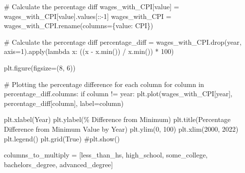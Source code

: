 \documentclass[
  letterpaper,
  DIV=11,
  numbers=noendperiod]{scrartcl}
\newenvironment{Shaded}{\begin{snugshade}}{\end{snugshade}}
\newcommand{\BuiltInTok}[1]{\textcolor[rgb]{0.00,0.23,0.31}{#1}}
\newcommand{\CommentTok}[1]{\textcolor[rgb]{0.37,0.37,0.37}{#1}}
\newcommand{\ControlFlowTok}[1]{\textcolor[rgb]{0.00,0.23,0.31}{#1}}
\newcommand{\DecValTok}[1]{\textcolor[rgb]{0.68,0.00,0.00}{#1}}
\newcommand{\KeywordTok}[1]{\textcolor[rgb]{0.00,0.23,0.31}{#1}}
\newcommand{\NormalTok}[1]{\textcolor[rgb]{0.00,0.23,0.31}{#1}}
\newcommand{\OperatorTok}[1]{\textcolor[rgb]{0.37,0.37,0.37}{#1}}
\newcommand{\StringTok}[1]{\textcolor[rgb]{0.13,0.47,0.30}{#1}}
\newcommand{\VariableTok}[1]{\textcolor[rgb]{0.07,0.07,0.07}{#1}}
\begin{document}
\begin{Shaded}
\begin{Highlighting}[]
\CommentTok{\# Calculate the percentage diff}
\NormalTok{wages\_with\_CPI[}\StringTok{\textquotesingle{}value\textquotesingle{}}\NormalTok{] }\OperatorTok{=}\NormalTok{ wages\_with\_CPI[}\StringTok{\textquotesingle{}value\textquotesingle{}}\NormalTok{].values[::}\OperatorTok{{-}}\DecValTok{1}\NormalTok{]}
\NormalTok{wages\_with\_CPI }\OperatorTok{=}\NormalTok{ wages\_with\_CPI.rename(columns}\OperatorTok{=}\NormalTok{\{}\StringTok{\textquotesingle{}value\textquotesingle{}}\NormalTok{: }\StringTok{\textquotesingle{}CPI\textquotesingle{}}\NormalTok{\})}

\CommentTok{\# Calculate the percentage diff}
\NormalTok{percentage\_diff }\OperatorTok{=}\NormalTok{ wages\_with\_CPI.drop(}\StringTok{\textquotesingle{}year\textquotesingle{}}\NormalTok{, axis}\OperatorTok{=}\DecValTok{1}\NormalTok{).}\BuiltInTok{apply}\NormalTok{(}\KeywordTok{lambda}\NormalTok{ x: ((x }\OperatorTok{{-}}\NormalTok{ x.}\BuiltInTok{min}\NormalTok{()) }\OperatorTok{/}\NormalTok{ x.}\BuiltInTok{min}\NormalTok{()) }\OperatorTok{*} \DecValTok{100}\NormalTok{)}

\NormalTok{plt.figure(figsize}\OperatorTok{=}\NormalTok{(}\DecValTok{8}\NormalTok{, }\DecValTok{6}\NormalTok{))}

\CommentTok{\# Plotting the percentage difference for each column}
\ControlFlowTok{for}\NormalTok{ column }\KeywordTok{in}\NormalTok{ percentage\_diff.columns:}
    \ControlFlowTok{if}\NormalTok{ column }\OperatorTok{!=} \StringTok{\textquotesingle{}year\textquotesingle{}}\NormalTok{:  }
\NormalTok{        plt.plot(wages\_with\_CPI[}\StringTok{\textquotesingle{}year\textquotesingle{}}\NormalTok{], percentage\_diff[column], label}\OperatorTok{=}\NormalTok{column)}

\NormalTok{plt.xlabel(}\StringTok{\textquotesingle{}Year\textquotesingle{}}\NormalTok{)}
\NormalTok{plt.ylabel(}\StringTok{\textquotesingle{}\% Difference from Minimum\textquotesingle{}}\NormalTok{)}
\NormalTok{plt.title(}\StringTok{\textquotesingle{}Percentage Difference from Minimum Value by Year\textquotesingle{}}\NormalTok{)}
\NormalTok{plt.ylim(}\DecValTok{0}\NormalTok{, }\DecValTok{100}\NormalTok{)}
\NormalTok{plt.xlim(}\DecValTok{2000}\NormalTok{, }\DecValTok{2022}\NormalTok{)}
\NormalTok{plt.legend()}
\NormalTok{plt.grid(}\VariableTok{True}\NormalTok{)}
\CommentTok{\#plt.show()}


\NormalTok{columns\_to\_multiply }\OperatorTok{=}\NormalTok{ [}\StringTok{\textquotesingle{}less\_than\_hs\textquotesingle{}}\NormalTok{, }\StringTok{\textquotesingle{}high\_school\textquotesingle{}}\NormalTok{, }\StringTok{\textquotesingle{}some\_college\textquotesingle{}}\NormalTok{, }\StringTok{\textquotesingle{}bachelors\_degree\textquotesingle{}}\NormalTok{, }\StringTok{\textquotesingle{}advanced\_degree\textquotesingle{}}\NormalTok{]}


\end{Highlighting}
\end{Shaded}
\end{document}
